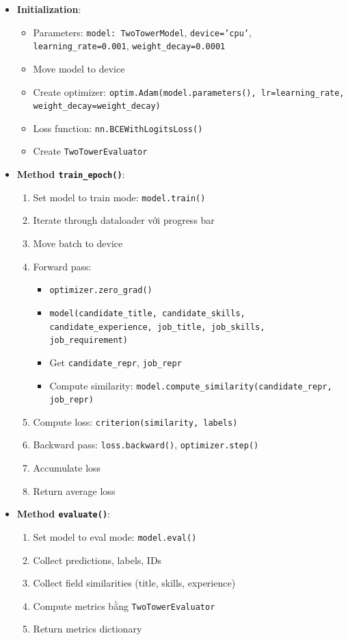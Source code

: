 \begin{itemize}
    \item \textbf{Initialization}:
    \begin{itemize}
        \item Parameters: \texttt{model: TwoTowerModel}, \texttt{device='cpu'}, \texttt{learning\_rate=0.001}, \texttt{weight\_decay=0.0001}
        \item Move model to device
        \item Create optimizer: \texttt{optim.Adam(model.parameters(), lr=learning\_rate, weight\_decay=weight\_decay)}
        \item Loss function: \texttt{nn.BCEWithLogitsLoss()}
        \item Create \texttt{TwoTowerEvaluator}
    \end{itemize}
    
    \item \textbf{Method \texttt{train\_epoch()}}:
    \begin{enumerate}
        \item Set model to train mode: \texttt{model.train()}
        \item Iterate through dataloader với progress bar
        \item Move batch to device
        \item Forward pass:
        \begin{itemize}
            \item \texttt{optimizer.zero\_grad()}
            \item \texttt{model(candidate\_title, candidate\_skills, candidate\_experience, job\_title, job\_skills, job\_requirement)}
            \item Get \texttt{candidate\_repr}, \texttt{job\_repr}
            \item Compute similarity: \texttt{model.compute\_similarity(candidate\_repr, job\_repr)}
        \end{itemize}
        \item Compute loss: \texttt{criterion(similarity, labels)}
        \item Backward pass: \texttt{loss.backward()}, \texttt{optimizer.step()}
        \item Accumulate loss
        \item Return average loss
    \end{enumerate}
    
    \item \textbf{Method \texttt{evaluate()}}:
    \begin{enumerate}
        \item Set model to eval mode: \texttt{model.eval()}
        \item Collect predictions, labels, IDs
        \item Collect field similarities (title, skills, experience)
        \item Compute metrics bằng \texttt{TwoTowerEvaluator}
        \item Return metrics dictionary
    \end{enumerate}
\end{itemize}

